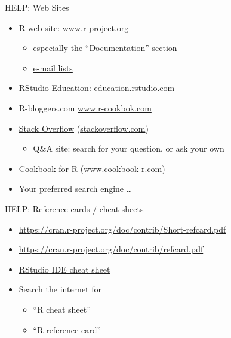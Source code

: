 \documentclass[
  11pt,
  ignorenonframetext,
]{beamer}
\providecommand{\tightlist}{%
  \setlength{\itemsep}{0pt}\setlength{\parskip}{0pt}}
\begin{document}
\begin{frame}{HELP: Web Sites}
\protect\hypertarget{help-web-sites}{}
\begin{itemize}
\item
  R web site: \href{http://www.r-project.org}{www.r-project.org}

  \begin{itemize}
  \tightlist
  \item
    especially the ``Documentation'' section
  \item
    \href{https://www.r-project.org/mail.html}{e-mail lists}
  \end{itemize}
\item
  \href{https://education.rstudio.com/}{RStudio Education}:
  \href{https://education.rstudio.com/}{education.rstudio.com}
\item
  R-bloggers.com \href{http://www.r-cookbok.com}{www.r-cookbok.com}
\item
  \href{https://stackoverflow.com/questions/tagged/r}{Stack Overflow}
  (\href{https://stackoverflow.com/questions/tagged/r}{stackoverflow.com})

  \begin{itemize}
  \tightlist
  \item
    Q\&A site: search for your question, or ask your own
  \end{itemize}
\item
  \href{http://www.cookbook-r.com/}{Cookbook for R}
  (\href{http://www.cookbook-r.com/}{www.cookbook-r.com})
\item
  Your preferred search engine \ldots{}
\end{itemize}
\end{frame}

\begin{frame}{HELP: Reference cards / cheat sheets}
\protect\hypertarget{help-reference-cards-cheat-sheets}{}
\begin{itemize}
\item
  \url{https://cran.r-project.org/doc/contrib/Short-refcard.pdf}
\item
  \url{https://cran.r-project.org/doc/contrib/refcard.pdf}
\item
  \href{https://raw.githubusercontent.com/rstudio/cheatsheets/main/rstudio-ide.pdf}{RStudio
  IDE cheat sheet}
\item
  Search the internet for

  \begin{itemize}
  \tightlist
  \item
    ``R cheat sheet''
  \item
    ``R reference card''
  \end{itemize}
\end{itemize}

\end{frame}
\end{document}
